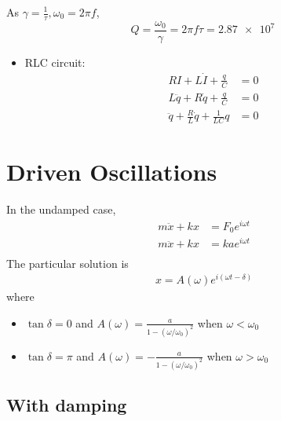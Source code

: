 \documentclass[a4paper]{article}
\numberwithin{equation}{section}
\begin{document}
\begin{sol}
    As $\gamma=\frac{1}{\tau}, \omega_0=2\pi f$, 
    \begin{equation}
        Q=\frac{\omega_0}{\gamma}=2\pi f\tau=\SI{2.87e+7}{}
    \end{equation}
\end{sol}
\begin{itemize}
    \item RLC circuit:
    \begin{align}
        RI+L\dot I+\frac{q}{C}&=0\\
        L\ddot q+R\dot q+\frac{q}{C}&=0\\
        \ddot q+\frac{R}{L}\dot q+\frac{1}{LC}q&=0
    \end{align}
\end{itemize}
\section{Driven Oscillations}
In the undamped case,
\begin{align}
    m\ddot x+kx&=F_0e^{i\omega t}\\
    m\ddot x+kx&=ka e^{i\omega t}\\
\end{align}
The particular solution is 
\begin{align}
    x=A(\omega)e^{i(\omega t-\delta)}
\end{align} 
where
\begin{itemize}
    \item $\tan\delta=0$ and $A(\omega)=\frac{a}{1-(\omega/\omega_0)^2}$ when $\omega<\omega_0$
    \item $\tan\delta=\pi$ and $A(\omega)=-\frac{a}{1-(\omega/\omega_0)^2}$ when $\omega>\omega_0$
\end{itemize}

\subsection{With damping}
\end{document}
